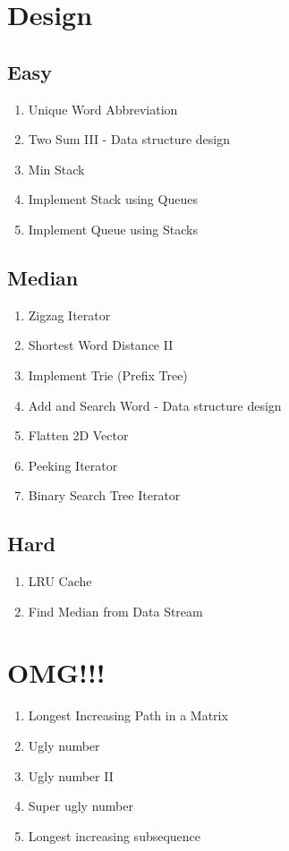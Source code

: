 \documentclass[DIV=calc, paper=a4, fontsize=11pt, twocolumn]{scrartcl}	 %
\begin{document}

\section*{Design}

\subsection*{Easy}
\begin{enumerate}
\item Unique Word Abbreviation \cite{288}
\item Two Sum III - Data structure design \cite{170}
\item Min Stack  \cite{155}
\item Implement Stack using Queues \cite{225}
\item Implement Queue using Stacks \cite{232}
\end{enumerate}

\subsection*{Median}
\begin{enumerate}
\item Zigzag Iterator \cite{281}
\item Shortest Word Distance II \cite{244}
\item Implement Trie (Prefix Tree) \cite{208}
\item Add and Search Word - Data structure design \cite{211}
\item Flatten 2D Vector \cite{251}
\item Peeking Iterator \cite{284}
\item Binary Search Tree Iterator \cite{173}
\end{enumerate}

\subsection*{Hard}
\begin{enumerate}
\item LRU Cache \cite{146}
\item Find Median from Data Stream \cite{295}
\end{enumerate}


\section*{OMG!!!}
\begin{enumerate}
\item Longest Increasing Path in a Matrix
\item Ugly number
\item Ugly number II
\item Super ugly number
\item Longest increasing subsequence
\end{enumerate}
\end{document}
